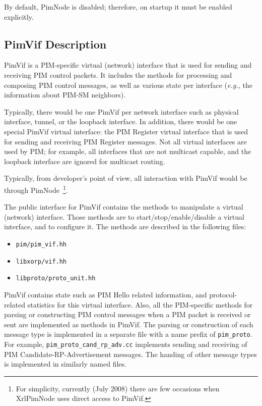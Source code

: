 \documentclass[11pt]{article}
\newcommand{\eg}{\emph{e.g.,}\xspace}
\begin{document}
By default, PimNode is disabled; therefore, on startup it must be enabled
explicitly.

\subsection{PimVif Description}

PimVif is a PIM-specific virtual (network) interface that is used for sending
and receiving PIM control packets. It includes the methods for processing and
composing PIM control messages, as well as various state per interface
(\eg the information about PIM-SM neighbors).

Typically, there would be one PimVif per network interface such as
physical interface, tunnel, or the loopback
interface. In addition, there would be one special PimVif virtual
interface: the PIM Register virtual interface that is used for sending
and receiving PIM Register messages. Not all virtual interfaces are
used by PIM; for example, all interfaces that are not multicast
capable, and the loopback interface are ignored for multicast
routing.

Typically, from developer's point of view, all interaction with PimVif
would be through PimNode~\footnote{For simplicity, currently (July 2008)
there are few occasions when XrlPimNode uses direct access to PimVif.}.

The public interface for PimVif contains the methods to manipulate a
virtual (network) interface. Those methods are to start/stop/enable/disable a
virtual interface, and to configure it. The methods are described in
the following files:

\begin{itemize}
  \item \verb=pim/pim_vif.hh=
  \item \verb=libxorp/vif.hh=
  \item \verb=libproto/proto_unit.hh=
\end{itemize}

PimVif contains state such as PIM Hello related information, and
protocol-related statistics for this virtual interface. Also, all
the PIM-specific methods for parsing or constructing PIM control
messages when a PIM packet is received or sent are implemented as
methods in PimVif. The parsing or construction of each message type is
implemented in a separate file with a name prefix of \verb=pim_proto=.
For example, \verb=pim_proto_cand_rp_adv.cc= implements sending and
receiving of PIM Candidate-RP-Advertisement messages. The handing of
other message types is implemented in similarly named files.
\end{document}

